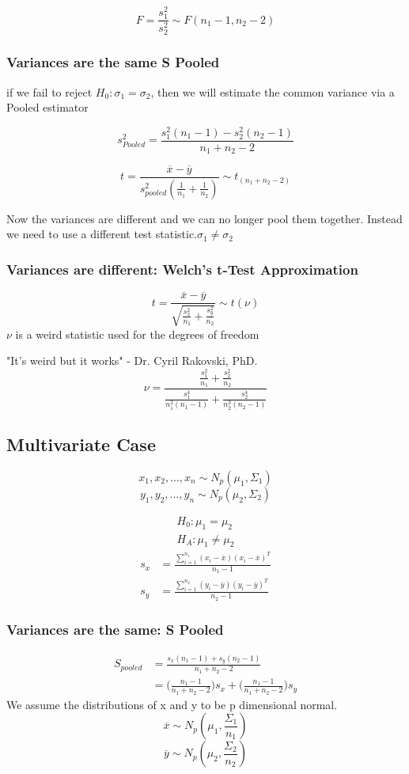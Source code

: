 \[F = \frac{s_1^2}{s_2^2}\sim F(n_1-1,n_2-2)\]
\subsubsection{Variances are the same S Pooled}
if we fail to reject $H_0: \sigma_1 = \sigma_2$, then we will estimate the common variance via a Pooled estimator

\[s^2_{Pooled} = \frac{s^2_1(n_1-1)-s^2_2(n_2-1)}{n_1+n_2-2}\]

\[t = \frac{\overline{x}
-\overline{y}}{s^2_{pooled}(\frac{1}{n_1}+\frac{1}{n_2})}\sim t_(n_1+n_2-2)\]

Now the variances are different and we can no longer pool them together. Instead we need to use a different test statistic.$\sigma_1\neq\sigma_2$
\subsubsection{Variances are different: Welch's t-Test Approximation}
\[t=\frac{\overline{x}
-\overline{y}}{\sqrt{\frac{s^2_x}{n_1} + \frac{s^2_y}{n_2}}}\sim t(\nu)\]
$\nu$ is a weird statistic used for the degrees of freedom

"It's weird but it works" - Dr. Cyril Rakovski, PhD.
\[\nu = \frac{  
\frac{s_1^2}{n_1} +\frac{s_2^2}{n_2}
}{
\frac{s_1^4}{n_1^2(n_1-1)} +\frac{s_2^4}{n_2^2(n_2-1)}
}\]

\subsection{Multivariate Case}
\[x_1,x_2,...,x_n \sim N_p(\mu_1,\Sigma_1)\]
\[y_1,y_2,...,y_n \sim N_p(\mu_2,\Sigma_2)\]

\begin{gather*}
    H_0 : \mu_1 = \mu_2\\
    H_A : \mu_1 \neq \mu_2
\end{gather*}
\begin{align*}
    s_x &= \frac{\displaystyle\sum_{i=1}^{n_1} (x_i-\overline{x})(x_i-\overline{x})^T}{n_1-1}\\
    s_y &= \frac{\displaystyle\sum_{i=1}^{n_2} (y_i-\overline{y})(y_i-\overline{y})^T}{n_2-1}
\end{align*}
\subsubsection{Variances are the same: S Pooled}

\begin{align*}
    S_{pooled}&= \frac{s_x(n_1-1) + s_y(n_2-1)}{n_1+n_2-2} \\
    &= \Bigg(
    \frac{n_1-1}{n_1+n_2-2}
    \Bigg) s_x +
    \Bigg(
    \frac{n_1-1}{n_1+n_2-2}
    \Bigg)s_y
\end{align*}
We assume the distributions of x and y to be p dimensional normal.
\[\overline{x} \sim N_p(\mu_1,\frac{\Sigma_1}{n_1})\]
\[\overline{y} \sim N_p(\mu_2,\frac{\Sigma_2}{n_2})\]

